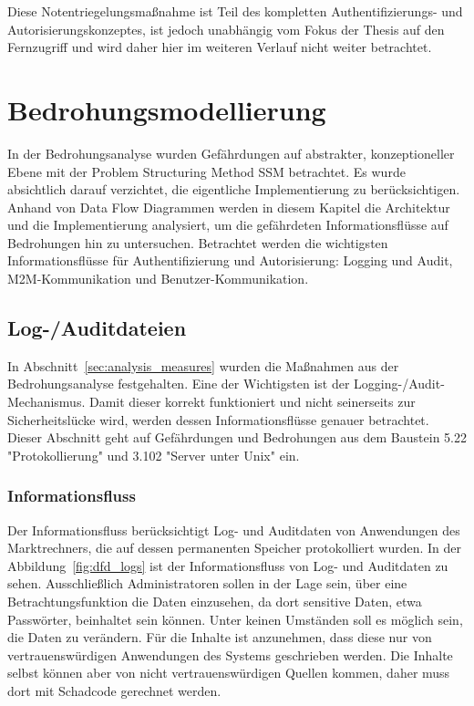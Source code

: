 \documentclass[11pt,a4paper]{report}
\begin{document}
Diese Notentriegelungsmaßnahme ist Teil des kompletten Authentifizierungs- und Autorisierungskonzeptes, ist jedoch unabhängig vom Fokus der Thesis auf den Fernzugriff und wird daher hier im weiteren Verlauf nicht weiter betrachtet.

\chapter{Bedrohungsmodellierung} \label{chap:threat_modelling}

In der Bedrohungsanalyse wurden Gefährdungen auf abstrakter, konzeptioneller Ebene mit der Problem Structuring Method SSM betrachtet. Es wurde absichtlich darauf verzichtet, die eigentliche Implementierung zu berücksichtigen. Anhand von Data Flow Diagrammen werden in diesem Kapitel die Architektur und die Implementierung analysiert, um die gefährdeten Informationsflüsse auf Bedrohungen hin zu untersuchen. Betrachtet werden die wichtigsten Informationsflüsse für Authentifizierung und Autorisierung: Logging und Audit, M2M-Kommunikation und Benutzer-Kommunikation.

\section{Log-/Auditdateien} \label{sec:bmod_logaud} 

In Abschnitt~\ref{sec:analysis_measures} wurden die Maßnahmen aus der Bedrohungsanalyse festgehalten. Eine der Wichtigsten ist der Logging-/Audit-Mechanismus. Damit dieser korrekt funktioniert und nicht seinerseits zur Sicherheitslücke wird, werden dessen Informationsflüsse genauer betrachtet. Dieser Abschnitt geht auf Gefährdungen und Bedrohungen aus dem Baustein 5.22 "Protokollierung" und 3.102 "Server unter Unix" ein.

\subsection{Informationsfluss}

Der Informationsfluss berücksichtigt Log- und Auditdaten von Anwendungen des Marktrechners, die auf dessen permanenten Speicher protokolliert wurden. In der Abbildung~\ref{fig:dfd_logs} ist der Informationsfluss von Log- und Auditdaten zu sehen. Ausschließlich Administratoren sollen in der Lage sein, über eine  Betrachtungsfunktion die Daten einzusehen, da dort sensitive Daten, etwa Passwörter, beinhaltet sein können. Unter keinen Umständen soll es möglich sein, die Daten zu verändern. Für die Inhalte ist anzunehmen, dass diese nur von vertrauenswürdigen Anwendungen des Systems geschrieben werden. Die Inhalte selbst können aber von nicht vertrauenswürdigen Quellen kommen, daher muss dort mit Schadcode gerechnet werden.
\end{document}
